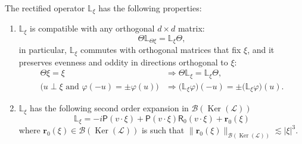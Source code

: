 \documentclass[AHL,Unicode,longabstracts,published]{cedram}
\DeclareMathOperator{\nul}{Ker}
\newcommand{\sfR}{\mathsf{R}}
\newcommand{\Burr}{\mathbf{r}}
\newcommand{\rectL}{\mathbb{L}}
\newcommand{\LL}{\mathcal{L}}
\newcommand{\PP}{\mathsf{P}}
\newcommand{\BBB}{\mathscr{B}}
\begin{document}
\begin{lemm}\label{lem:rectified_operator}
The rectified operator $\rectL_{ \xi}$ has the following properties:
\begin{enumerate}
\item $\rectL_{ \xi}$ is compatible with any orthogonal $d \times d$ matrix:
\begin{equation*}
\Theta \rectL_{\Theta \xi} = \rectL_{\xi} \Theta,
\end{equation*}
in particular, $\rectL_{\xi}$ commutes with orthogonal matrices that fix $\xi$, and it preserves evenness and oddity in directions orthogonal to $\xi$:
\begin{align*}
\Theta \xi = \xi &\Longrightarrow \Theta \rectL_{\xi} = \rectL_\xi \Theta,\\
\Big(u \perp \xi \text{ and } \varphi(-u) = \pm \varphi(u) \Big) &\Longrightarrow \Big(\rectL_{\xi} \varphi \Big)(-u) = \pm \Big(\rectL_{\xi} \varphi \Big)(u).
\end{align*}
\item $\rectL_{\xi}$ has the following second order expansion in $\BBB(\nul(\LL))$
\begin{equation*}
\rectL_{\xi} = -i \PP (v \cdot \xi) + \PP (v \cdot \xi) \sfR_{0} (v \cdot \xi) + \Burr_0 (\xi)
\end{equation*}
where $\Burr_0(\xi) \in \BBB(\nul(\LL))$ is such that $\|\Burr_0(\xi)\|_{\BBB(\nul(\LL)) } \lesssim |\xi|^3.$
\end{enumerate}
\end{lemm}
\end{document}
